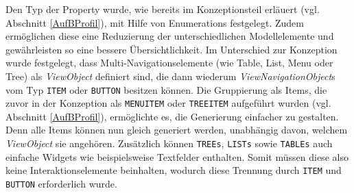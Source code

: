 Den Typ der Property wurde, wie bereits im Konzeptionsteil erläuert (vgl. Abschnitt \ref{AufBProfil}), mit Hilfe von Enumerations festgelegt. Zudem ermöglichen diese eine Reduzierung der unterschiedlichen Modellelemente und gewährleisten so eine bessere Übersichtlichkeit. Im Unterschied zur Konzeption wurde festgelegt, dass Multi-Navigationselemente (wie Table, List, Menu oder Tree) als \textit{ViewObject} definiert sind, die dann wiederum \textit{ViewNavigationObject}s vom Typ \texttt{ITEM} oder \texttt{BUTTON} besitzen können. Die Gruppierung als Items, die zuvor in der Konzeption als \texttt{MENUITEM} oder \texttt{TREEITEM} aufgeführt wurden (vgl. Abschnitt \ref{AufBProfil}), ermöglichte es, die Generierung einfacher zu gestalten. Denn alle Items können nun gleich generiert werden, unabhängig davon, welchem \textit{ViewObject} sie angehören. Zusätzlich können \texttt{TREEs}, \texttt{LISTs} sowie \texttt{TABLEs} auch einfache Widgets wie beispielsweise Textfelder enthalten. Somit müssen diese also keine Interaktionselemente beinhalten, wodurch diese Trennung durch \texttt{ITEM} und \texttt{BUTTON} erforderlich wurde.

